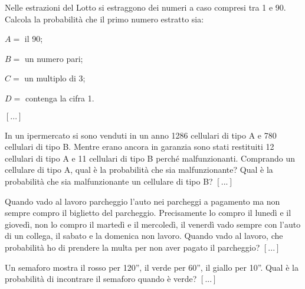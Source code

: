\begin{esercizio}
 \label{ese:9.24}
Nelle estrazioni del Lotto si estraggono dei numeri a caso compresi tra 1 e 90. 
Calcola la probabilità che il primo numero estratto sia:
\begin{itemize*}
\item \( A= \) il 90;
\item \( B= \) un numero pari;
\item \( C= \) un multiplo di 3;
\item \( D= \) contenga la cifra 1.
\end{itemize*}
\hfill \(\left[...\right]\)
\end{esercizio}

\begin{esercizio}
 \label{ese:9.25}
In un ipermercato si sono venduti in un anno 1286 cellulari di tipo A e 780 
cellulari di tipo B. Mentre erano ancora in garanzia sono stati restituiti 12 
cellulari di tipo A e 11 cellulari di tipo B perché malfunzionanti. Comprando un 
cellulare di tipo A, qual è la probabilità che sia malfunzionante? Qual è la 
probabilità che sia malfunzionante un cellulare di tipo B?
\hfill \(\left[...\right]\)
\end{esercizio}

\begin{esercizio}
 \label{ese:9.26}
Quando vado al lavoro parcheggio l'auto nei parcheggi a pagamento ma non sempre 
compro il biglietto del parcheggio. Precisamente lo compro il lunedì e il 
giovedì, non lo compro il martedì e il mercoledì, il venerdì vado sempre con 
l'auto di un collega, il sabato e la domenica non lavoro. Quando vado al lavoro, 
che probabilità ho di prendere la multa per non aver pagato il parcheggio?
\hfill \(\left[...\right]\)
\end{esercizio}

\begin{esercizio}
 \label{ese:9.27}
Un semaforo mostra il rosso per 120'', il verde per 60'', il giallo per 10''. 
Qual è la probabilità di incontrare il semaforo quando è verde?
\hfill \(\left[...\right]\)
\end{esercizio}

\subsubsection*{}

